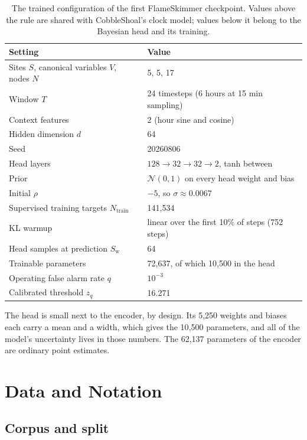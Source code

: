 \documentclass{article}
\begin{document}
\begin{table}[t]
  \centering
  \caption{The trained configuration of the first FlameSkimmer checkpoint.
    Values above the rule are shared with CobbleShoal's clock model; values
    below it belong to the Bayesian head and its training.}
  \label{tab:config}
  \begin{tabular}{ll}
    \toprule
    Setting & Value \\
    \midrule
    Sites $S$, canonical variables $V$, nodes $N$ & 5, 5, 17 \\
    Window $T$ & 24 timesteps (6 hours at 15 min sampling) \\
    Context features & 2 (hour sine and cosine) \\
    Hidden dimension $d$ & 64 \\
    Seed & 20260806 \\
    \midrule
    Head layers & $128 \to 32 \to 32 \to 2$, tanh between \\
    Prior & $\mathcal{N}(0, 1)$ on every head weight and bias \\
    Initial $\rho$ & $-5$, so $\sigma \approx 0.0067$ \\
    Supervised training targets $N_{\mathrm{train}}$ & 141{,}534 \\
    KL warmup & linear over the first 10\% of steps (752 steps) \\
    Head samples at prediction $S_{\mathrm{w}}$ & 64 \\
    Trainable parameters & 72{,}637, of which 10{,}500 in the head \\
    Operating false alarm rate $q$ & $10^{-3}$ \\
    Calibrated threshold $z_q$ & 16.271 \\
    \bottomrule
  \end{tabular}
\end{table}

The head is small next to the encoder, by design. Its 5{,}250 weights and
biases each carry a mean and a width, which gives the 10{,}500 parameters, and
all of the model's uncertainty lives in those numbers. The 62{,}137 parameters
of the encoder are ordinary point estimates.

\section{Data and Notation}
\label{sec:data}

\subsection{Corpus and split}
\label{sec:corpus}
\end{document}
